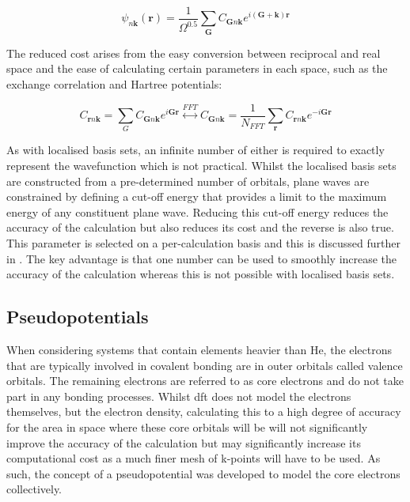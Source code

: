\begin{equation}
\psi_{n\mathbf{k}}(\mathbf{r}) = \frac{1}{\Omega^{0.5}} \sum_{\boldsymbol{G}} C_{\boldsymbol{G}n\mathbf{k}}e^{i(\boldsymbol{G}+\mathbf{k})\mathbf{r}}
\end{equation}

The reduced cost arises from the easy conversion between reciprocal and real space and the ease of calculating certain parameters in each space, such as the exchange correlation and Hartree potentials:

\begin{equation}
C_{\mathbf{r}n\mathbf{k}} = \sum_G C_{\boldsymbol{G}n\mathbf{k}} e^{i\boldsymbol{G}\mathbf{r}} \overset{FFT}{\leftrightarrow} C_{\mathbf{G}n\mathbf{k}} = \frac{1}{N_{FFT}} \sum_{\mathbf{r}} C_{\boldsymbol{r}n\mathbf{k}} e^{-i\boldsymbol{G}\mathbf{r}}
\end{equation}

As with localised basis sets, an infinite number of either is required to exactly represent the wavefunction which is not practical. Whilst the localised basis sets are constructed from a pre\nobreakdash-determined number of orbitals, plane waves are constrained by defining a cut\nobreakdash-off energy that provides a limit to the maximum energy of any constituent plane wave. Reducing this cut\nobreakdash-off energy reduces the accuracy of the calculation but also reduces its cost and the reverse is also true. This parameter is selected on a per\nobreakdash-calculation basis and this is discussed further in . The key advantage is that one number can be used to smoothly increase the accuracy of the calculation whereas this is not possible with localised basis sets.

\subsection{Pseudopotentials}
\label{subsec:pseudopot}
When considering systems that contain elements heavier than He, the electrons that are typically involved in covalent bonding are in outer orbitals called valence orbitals. The remaining electrons are referred to as core electrons and do not take part in any bonding processes. Whilst \acrshort{dft} does not model the electrons themselves, but the electron density, calculating this to a high degree of accuracy for the area in space where these core orbitals will be will not significantly improve the accuracy of the calculation but may significantly increase its computational cost as a much finer mesh of k\nobreakdash-points will have to be used. As such, the concept of a pseudopotential was developed to model the core electrons collectively.

